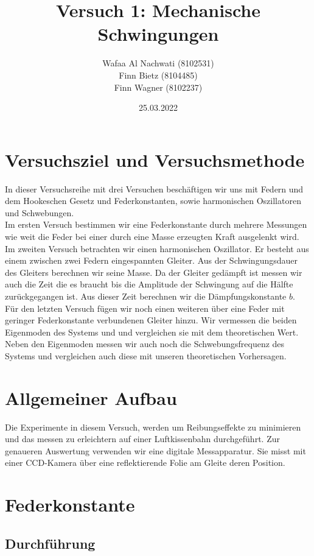 \documentclass{article}
\date{25.03.2022}
\title{Versuch 1: Mechanische Schwingungen}
\author{Wafaa Al Nachwati (8102531) \\ Finn Bietz (8104485) \\ Finn Wagner (8102237)}
\begin{document}
    

	\maketitle

    \section{Versuchsziel und Versuchsmethode}
        In dieser Versuchsreihe mit drei Versuchen beschäftigen wir uns mit Federn und dem Hookeschen Gesetz und Federkonstanten,
        sowie harmonischen Oszillatoren und Schwebungen. \\
        Im ersten Versuch bestimmen wir eine Federkonstante durch mehrere Messungen wie weit die Feder bei einer durch eine Masse
        erzeugten Kraft ausgelenkt wird.
        Im zweiten Versuch betrachten wir einen harmonischen Oszillator. Er besteht aus einem zwischen zwei Federn eingespannten Gleiter.
        Aus der Schwingungsdauer des Gleiters berechnen wir seine Masse.
        Da der Gleiter gedämpft ist messen wir auch die Zeit die es braucht bis die Amplitude der Schwingung auf die Hälfte zurückgegangen ist.
        Aus dieser Zeit berechnen wir die Dämpfungskonstante \(b\). \\
        Für den letzten Versuch fügen wir noch einen weiteren über eine Feder mit geringer Federkonstante verbundenen Gleiter hinzu.
        Wir vermessen die beiden Eigenmoden des Systems und und vergleichen sie mit dem theoretischen Wert. 
        Neben den Eigenmoden messen wir auch noch die Schwebungsfrequenz des Systems und vergleichen auch diese mit unseren theoretischen Vorhersagen.

    \section{Allgemeiner Aufbau}
        Die Experimente in diesem Versuch, werden um Reibungseffekte zu minimieren und das messen zu erleichtern auf einer Luftkissenbahn durchgeführt.
        Zur genaueren Auswertung verwenden wir eine digitale Messapparatur. Sie misst mit einer CCD-Kamera über eine reflektierende Folie am Gleite deren Position.

    \section{Federkonstante}
        \subsection{Durchführung}
\end{document}
